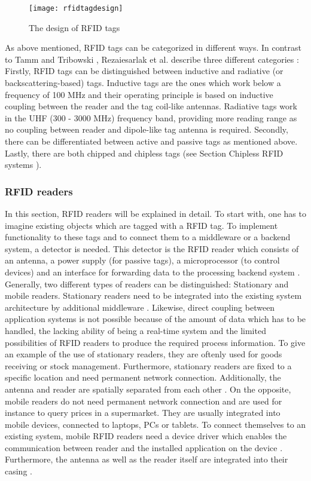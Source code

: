 \begin{figure}
\centering
\texttt{[image: rfidtagdesign]} 
\caption{\label{fig:tagdesign}The design of RFID tags  \cite[p.13]{chipless}} 
\end{figure}

As above mentioned, RFID tags can be categorized in different ways. In contrast to Tamm and Tribowski \pageref{classes}, Rezaiesarlak et al. \cite{chipless} describe three different categories \cite[p.9 ff.]{chipless}: Firstly, RFID tags can be distinguished between inductive and radiative (or backscattering-based) tags. Inductive tags are the ones which work below a frequency of 100 MHz and their operating principle is based on inductive coupling between the reader and the tag coil-like antennas. Radiative tags work in the UHF (300 - 3000 MHz) frequency band, providing more reading range as no coupling between reader and dipole-like tag antenna is required. Secondly, there can be differentiated between active and passive tags as mentioned above. Lastly, there are both chipped and chipless tags (see Section Chipless RFID systems \pageref{chipless}). 

\subsubsection{RFID readers} \label{reader}

In this section, RFID readers will be explained in detail. 
To start with, one has to imagine existing objects which are tagged with a RFID tag. To implement functionality to these tags and to connect them to a middleware or a backend system, a detector is needed. This detector is the RFID reader which consists of an antenna, a power supply (for passive tags), a microprocessor (to control devices) and an interface for forwarding data to the processing backend system \cite{henrici}. 
Generally, two different types of readers can be distinguished: Stationary and mobile readers. Stationary readers need to be integrated into the existing system architecture by additional middleware \cite[p.133 ff.]{mobile}. Likewise, direct coupling between application systems is not possible because of the amount of data which has to be handled, the lacking ability of being a real-time system and the limited possibilities of RFID readers to produce the required process information. To give an example of the use of stationary readers, they are oftenly used for goods receiving or stock management. Furthermore, stationary readers are fixed to a specific location and need permanent network connection. Additionally, the antenna and reader are spatially separated from each other \cite[p.17 ff.]{fokus}.
On the opposite, mobile readers do not need permanent network connection and are used for instance to query prices in a supermarket. They are usually integrated into mobile devices, connected to laptops, \ac{PC}s or tablets. To connect themselves to an existing system, mobile RFID readers need a device driver which enables the communication between reader and the installed application on the device \cite[p.133 ff.]{mobile}. Furthermore, the antenna as well as the reader itself are integrated into their casing \cite[p.17 ff.]{fokus}.

